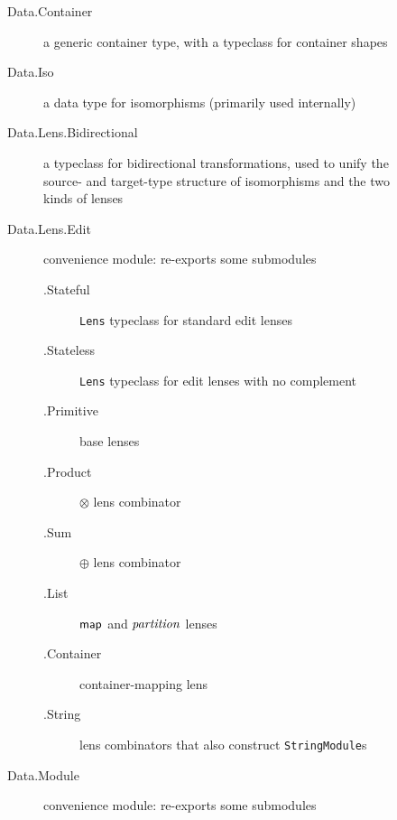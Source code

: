 \begin{figure}
    \centering
    \begin{description}
        \item[Data.Container] a generic container type, with a typeclass for
            container shapes
        \item[Data.Iso] a data type for isomorphisms (primarily used internally)
        \item[Data.Lens.Bidirectional] a typeclass for bidirectional
            transformations, used to unify the source- and target-type
            structure of isomorphisms and the two kinds of lenses
        \item[Data.Lens.Edit] convenience module: re-exports some submodules

            \begin{description}
                \item[.Stateful] \lstinline!Lens! typeclass for standard edit
                    lenses
                \item[.Stateless] \lstinline!Lens! typeclass for edit lenses
                    with no complement
                \item[.Primitive] base lenses
                \item[.Product] $\otimes$ lens combinator
                \item[.Sum] $\oplus$ lens combinator
                \item[.List] $\mathsf{map}$ and $\mathit{partition}$ lenses
                \item[.Container] container-mapping lens
                \item[.String] lens combinators that also construct
                    \lstinline!StringModule!s
            \end{description}
        \item[Data.Module] convenience module: re-exports some submodules


\end{description}
\end{figure}
